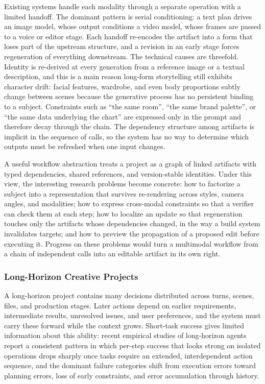 Existing systems handle each modality through a separate operation with a limited handoff. The dominant pattern is serial conditioning: a text plan drives an image model, whose output conditions a video model, whose frames are passed to a voice or editor stage. Each handoff re-encodes the artifact into a form that loses part of the upstream structure, and a revision in an early stage forces regeneration of everything downstream. The technical causes are threefold. Identity is re-derived at every generation from a reference image or a textual description, and this is a main reason long-form storytelling still exhibits character drift: facial features, wardrobe, and even body proportions subtly change between scenes because the generative process has no persistent binding to a subject. Constraints such as ``the same room'', ``the same brand palette'', or ``the same data underlying the chart'' are expressed only in the prompt and therefore decay through the chain. The dependency structure among artifacts is implicit in the sequence of calls, so the system has no way to determine which outputs must be refreshed when one input changes.

A useful workflow abstraction treats a project as a graph of linked artifacts with typed dependencies, shared references, and version-stable identities. Under this view, the interesting research problems become concrete: how to factorize a subject into a representation that survives re-rendering across styles, camera angles, and modalities; how to express cross-modal constraints so that a verifier can check them at each step; how to localize an update so that regeneration touches only the artifacts whose dependencies changed, in the way a build system invalidates targets; and how to preview the propagation of a proposed edit before executing it. Progress on these problems would turn a multimodal workflow from a chain of independent calls into an editable artifact in its own right.

\subsubsection{Long-Horizon Creative Projects}

A long-horizon project contains many decisions distributed across turns, scenes, files, and production stages. Later actions depend on earlier requirements, intermediate results, unresolved issues, and user preferences, and the system must carry these forward while the context grows. Short-task success gives limited information about this ability: recent empirical studies of long-horizon agents report a consistent pattern in which per-step success that looks strong on isolated operations drops sharply once tasks require an extended, interdependent action sequence, and the dominant failure categories shift from execution errors toward planning errors, loss of early constraints, and error accumulation through history.

